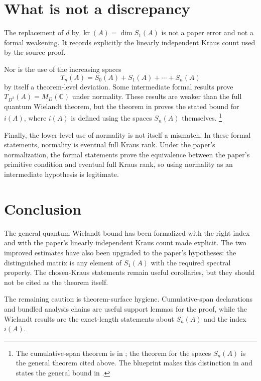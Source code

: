 \documentclass{article}
\begin{document}
\section{What is not a discrepancy}

The replacement of $d$ by $\operatorname{kr}(A)=\dim S_1(A)$ is not a paper
error and not a formal weakening. It records explicitly the linearly independent
Kraus count used by the source proof.

Nor is the use of the increasing spaces
\[
    T_n(A)=S_0(A)+S_1(A)+\cdots+S_n(A)
\]
by itself a theorem-level deviation. Some intermediate formal results prove
$T_{D^2}(A)=M_D(\mathbb C)$ under normality. These results are weaker than the
full quantum Wielandt theorem, but the theorem in
 proves the stated bound for
$i(A)$, where $i(A)$ is defined using the spaces $S_n(A)$ themselves.
\footnote{The cumulative-span theorem is
     in
    ; the
    theorem for the spaces $S_n(A)$ is the general theorem cited above.
    The blueprint makes this distinction in
     and states the general
    bound in .}

Finally, the lower-level use of normality is not itself a mismatch. In these
formal statements, normality is eventual full Kraus rank. Under the paper's
normalization, the formal statements prove the equivalence between the paper's
primitive condition and eventual full Kraus rank, so using normality as an
intermediate hypothesis is legitimate.

\section{Conclusion}

The general quantum Wielandt bound has been formalized with the right index and
with the paper's linearly independent Kraus count made explicit. The two
improved estimates have also been upgraded to the paper's hypotheses: the
distinguished matrix is any element of $S_1(A)$ with the required spectral
property. The chosen-Kraus statements remain useful corollaries, but they should
not be cited as the theorem itself.

The remaining caution is theorem-surface hygiene. Cumulative-span declarations
and bundled analysis chains are useful support lemmas for the proof, while the
Wielandt results are the exact-length statements about $S_n(A)$ and the
index $i(A)$.



\end{document}
